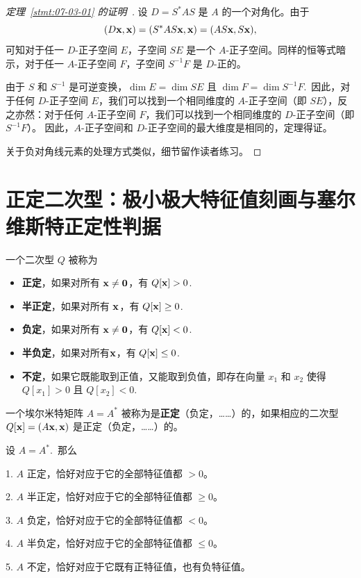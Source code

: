 \begin{proof}[\normalfont\heiti 定理~\ref{stmt:07-03-01} 的证明~\nopunct]
设 $D = S^*AS$ 是 $A$ 的一个对角化。由于
$$(D\mathbf{x}, \mathbf{x}) = (S^*AS\mathbf{x}, \mathbf{x}) = (AS\mathbf{x}, S\mathbf{x}),$$
可知对于任一 $D$-正子空间 $E$，子空间 $SE$ 是一个 $A$-正子空间。同样的恒等式暗示，对于任一 $A$-正子空间 $F$，子空间 $S^{-1}F$ 是 $D$-正的。

由于 $S$ 和 $S^{-1}$ 是可逆变换，$\dim E = \dim SE$ 且 $\dim F = \dim S^{-1}F$.~因此，对于任何 $D$-正子空间 $E$，我们可以找到一个相同维度的 $A$-正子空间（即 $SE$），反之亦然：对于任何 $A$-正子空间 $F$，我们可以找到一个相同维度的 $D$-正子空间（即 $S^{-1}F$）。
因此，$A$-正子空间和 $D$-正子空间的最大维度是相同的，定理得证。

关于负对角线元素的处理方式类似，细节留作读者练习。\end{proof}

\section{正定二次型：极小极大特征值刻画与塞尔维斯特正定性判据}\label{sec:07-04}

\begin{definition*}
一个二次型 $Q$ 被称为
\begin{itemize}
\item \textbf{正定}，如果对所有 $\mathbf{x} \ne \mathbf{0}$，有 $Q[\mathbf{x}] > 0$.~
\item \textbf{半正定}，如果对所有 $\mathbf{x}$，有 $Q[\mathbf{x}] \ge 0$.~
\item \textbf{负定}，如果对所有 $\mathbf{x} \ne \mathbf{0}$，有 $Q[\mathbf{x}] < 0$.~
\item \textbf{半负定}，如果对所有$\mathbf{x}$，有 $Q[\mathbf{x}] \le 0$.~
\item \textbf{不定}，如果它既能取到正值，又能取到负值，即存在向量 $x_1$ 和 $x_2$ 使得 $Q[x_1] > 0$ 且 $Q[x_2] < 0$.~
\end{itemize}
\end{definition*}

\begin{definition*}
一个埃尔米特矩阵 $A = A^*$ 被称为是\textbf{正定}（负定，……）的，如果相应的二次型 $Q[\mathbf{x}] = (A\mathbf{x}, \mathbf{x})$ 是正定（负定，……）的。
\end{definition*}

\begin{theorem}\label{stmt:07-04-01}
设 $A = A^*$.~那么

1. $A$ 正定，恰好对应于它的全部特征值都 $>0$。

2. $A$ 半正定，恰好对应于它的全部特征值都 $\ge 0$。

3. $A$ 负定，恰好对应于它的全部特征值都 $<0$。

4. $A$ 半负定，恰好对应于它的全部特征值都 $\le 0$。

5. $A$ 不定，恰好对应于它既有正特征值，也有负特征值。\end{theorem}

